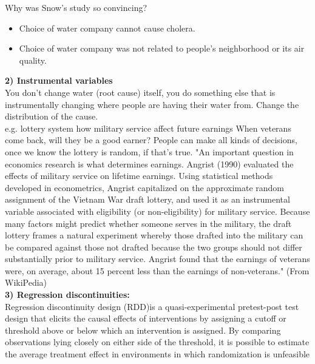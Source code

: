 \noindent Why was Snow’s study so convincing?\\
\begin{itemize}
  \item Choice of water company cannot cause cholera. 
  \item Choice of water company was not related to people’s neighborhood or its air quality.
\end{itemize}

\textbf{2) Instrumental variables}\\
You don’t change water (root cause) itself, you do something else that is instrumentally changing where people are having their water from. Change the distribution of the cause.\\
e.g. lottery system how military service affect future earnings
When veterans come back, will they be a good earner? People can make all kinds of decisions, once we know the lottery is random, if that’s true. 
"An important question in economics research is what determines earnings. Angrist (1990) evaluated the effects of military service on lifetime earnings. Using statistical methods developed in econometrics, Angrist capitalized on the approximate random assignment of the Vietnam War draft lottery, and used it as an instrumental variable associated with eligibility (or non-eligibility) for military service. Because many factors might predict whether someone serves in the military, the draft lottery frames a natural experiment whereby those drafted into the military can be compared against those not drafted because the two groups should not differ substantially prior to military service. Angrist found that the earnings of veterans were, on average, about 15 percent less than the earnings of non-veterans." (From WikiPedia)\\

\textbf{3) Regression discontinuities:}\\
Regression discontinuity design (RDD)is a quasi-experimental pretest-post test design that elicits the causal effects of interventions by assigning a cutoff or threshold above or below which an intervention is assigned. By comparing observations lying closely on either side of the threshold, it is possible to estimate the average treatment effect in environments in which randomization is unfeasible



